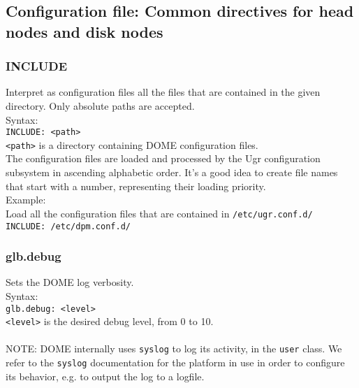 \documentclass[a4paper,10pt]{scrreprt}
\begin{document}
\subsection{Configuration file: Common directives for head nodes and disk nodes}

\subsubsection{INCLUDE}
Interpret as configuration files all the files that are contained in the given directory.
Only absolute paths are accepted.\\

Syntax:\\

\lstinline"INCLUDE: <path>"\\

\lstinline"<path>" is a directory containing DOME configuration files.\\

The configuration files are loaded and processed by the Ugr configuration subsystem
in ascending alphabetic order. It's a good idea to create file names that start with a number,
representing their loading priority.\\

Example:\\
Load all the configuration files that are contained in \lstinline"/etc/ugr.conf.d/"\\
\lstinline"INCLUDE: /etc/dpm.conf.d/"

\subsubsection{glb.debug}

 Sets the DOME log verbosity.\\
 
 Syntax:\\

\lstinline"glb.debug: <level>"\\

\lstinline"<level>" is the desired debug level, from 0 to 10.\\ \\
 NOTE: DOME internally uses \lstinline"syslog" to log its activity, in the \lstinline"user" class. We refer to the \lstinline"syslog" documentation for the platform in use in order to configure its behavior, e.g. to output the log to a logfile.\\
 
\end{document}
